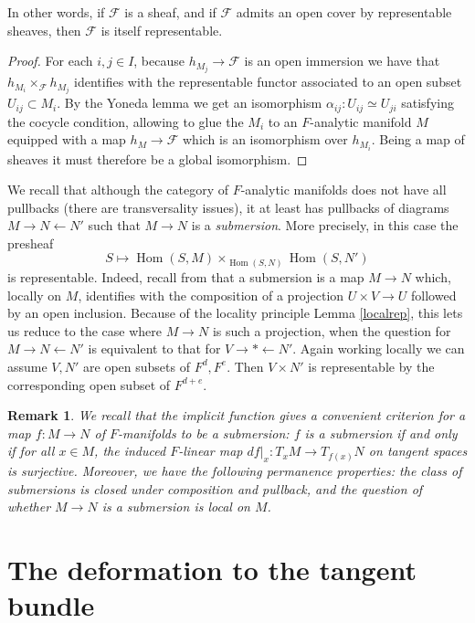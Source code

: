 \documentclass[12pt]{article}
\newtheorem{remark}[theorem]{Remark}
\begin{document}
In other words, if $\mathcal{F}$ is a sheaf, and if $\mathcal{F}$ admits an open cover by representable sheaves, then $\mathcal{F}$ is itself representable.

\begin{proof}
For each $i,j\in I$, because $h_{M_j}\rightarrow \mathcal{F}$ is an open immersion we have that $h_{M_i}\times_\mathcal{F} h_{M_j}$ identifies with the representable functor associated to an open subset $U_{ij}\subset M_i$.  By the Yoneda lemma we get an isomorphism $\alpha_{ij}:U_{ij}\simeq U_{ji}$ satisfying the cocycle condition, allowing to glue the $M_i$ to an $F$-analytic manifold $M$ equipped with a map $h_M\rightarrow\mathcal{F}$ which is an isomorphism over $h_{M_i}$.  Being a map of sheaves it must therefore be a global isomorphism.
\end{proof}

We recall that although the category of $F$-analytic manifolds does not have all pullbacks (there are transversality issues), it at least has pullbacks of diagrams $M\rightarrow N\leftarrow N'$ such that $M\rightarrow N$ is a \emph{submersion}.  More precisely, in this case the presheaf
$$S\mapsto \operatorname{Hom}(S,M)\times_{\operatorname{Hom}(S,N)}\operatorname{Hom}(S,N')$$
is representable.  Indeed, recall from \cite{SerreLie} that a submersion is a map $M\rightarrow N$ which, locally on $M$, identifies with the composition of a projection $U\times V\rightarrow U$ followed by an open inclusion.  Because of the locality principle Lemma \ref{localrep}, this lets us reduce to the case where $M\rightarrow N$ is such a projection, when the question for $M\rightarrow N\leftarrow N'$ is equivalent to that for $V\rightarrow \ast \leftarrow N'$.  Again working locally we can assume $V,N'$ are open subsets of $F^d,F^e$.  Then $V\times N'$ is representable by the corresponding open subset of $F^{d+e}$.  

\begin{remark}
We recall that the implicit function gives a convenient criterion for a map $f:M\rightarrow N$ of $F$-manifolds to be a submersion: $f$ is a submersion if and only if for all $x\in M$, the induced $F$-linear map $df|_x:T_xM\rightarrow T_{f(x)}N$ on tangent spaces is surjective.  Moreover, we have the following permanence properties: the class of submersions is closed under composition and pullback, and the question of whether $M\rightarrow N$ is a submersion is local on $M$.
\end{remark}


\section{The deformation to the tangent bundle}\label{defsec}
\end{document}
